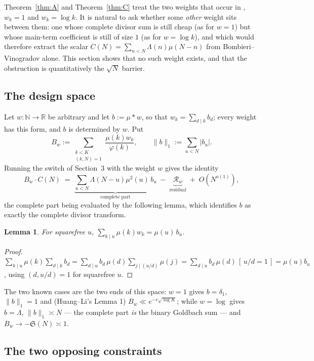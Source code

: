 \documentclass[11pt,a4paper]{article}
\theoremstyle{plain}
\newtheorem{lemma}[theorem]{Lemma}
\theoremstyle{definition}
\renewcommand{\SS}{\mathfrak{S}}
\begin{document}
Theorem~\ref{thm:A} and Theorem~\ref{thm:C} treat the two weights that
occur in \cite{HL}, $w_k = 1$ and $w_k = \log k$. It is natural to ask
whether some \emph{other} weight sits between them: one whose complete
divisor sum is still cheap (as for $w=1$) but whose main-term
coefficient is still of size $1$ (as for $w=\log k$), and which would
therefore extract the scalar $C(N)=\sum_{n<N}\Lambda(n)\mu(N-n)$ from
Bombieri--Vinogradov alone. This section shows that no such weight
exists, and that the obstruction is quantitatively the $\sqrt N$
barrier.

\subsection{The design space}

Let $w:\mathbb N\to\mathbb R$ be arbitrary and let
$b := \mu * w$, so that $w_k=\sum_{d\mid k}b_d$; every weight has this
form, and $b$ is determined by $w$. Put
\[
  B_w := \sum_{\substack{k<K\\(k,N)=1}}\frac{\mu(k)w_k}{\varphi(k)},
  \qquad
  \|b\|_1 := \sum_{u<N}|b_u| .
\]
Running the switch of Section~3 with the weight $w$ gives the identity
\begin{equation}\label{eq:extract}
  B_w\cdot C(N) \;=\; \underbrace{\sum_{u<N}\Lambda(N-u)\mu^2(u)\,b_u}
  _{\text{complete part}} \;-\; \underbrace{\mathcal R_w}_{\text{residual}}
  \;+\;O\!\left(N^{o(1)}\right),
\end{equation}
the complete part being evaluated by the following lemma, which
identifies $b$ as exactly the complete divisor transform.

\begin{lemma}\label{lem:Gb}
For squarefree $u$,
$\sum_{k\mid u}\mu(k)w_k = \mu(u)\,b_u$.
\end{lemma}

\begin{proof}
$\sum_{k\mid u}\mu(k)\sum_{d\mid k}b_d
 = \sum_{d\mid u}b_d\,\mu(d)\sum_{j\mid (u/d)}\mu(j)
 = \sum_{d\mid u}b_d\,\mu(d)\,[\,u/d=1\,] = \mu(u)b_u$,
using $(d,u/d)=1$ for squarefree $u$.
\end{proof}

The two known cases are the two ends of this space: $w=1$ gives
$b=\delta_1$, $\|b\|_1 = 1$ and (Huang--Li's Lemma 1)
$B_w\ll e^{-c\sqrt{\log K}}$; while $w=\log$ gives $b=\Lambda$,
$\|b\|_1\asymp N$ --- the complete part \emph{is} the binary Goldbach
sum --- and $B_w\to-\SS(N)\asymp1$.

\subsection{The two opposing constraints}
\end{document}

